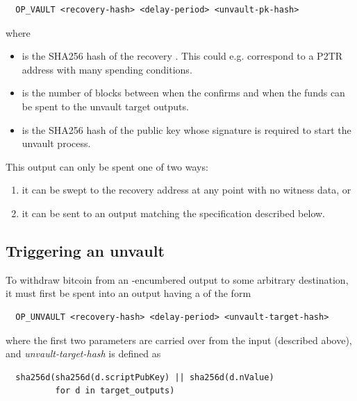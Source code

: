 \documentclass[10pt]{article}
\begin{document}
\begin{verbatim}
  OP_VAULT <recovery-hash> <delay-period> <unvault-pk-hash> 
\end{verbatim}
\noindent where

\begin{itemize}
  \item {} is the SHA256 hash of the recovery \spk{}. This could
    e.g. correspond to a P2TR address with many spending conditions.

  \item {} is the number of blocks between when the \opuv{} confirms
    and when the funds can be spent to the unvault target outputs.

  \item {} is the SHA256 hash of the public key whose signature is
    required to start the unvault process.

\end{itemize}

This output can only be spent one of two ways: 

\begin{enumerate}
  \item it can be swept to the recovery address at any point with no witness data, or
  \item it can be sent to an \opuv{} output matching the specification described
    below.
\end{enumerate}

\subsection*{Triggering an unvault}

To withdraw bitcoin from an \opv{}-encumbered output to some arbitrary destination, it
must first be spent into an \opuv{} output having a  of the form

\begin{verbatim}
  OP_UNVAULT <recovery-hash> <delay-period> <unvault-target-hash> 
\end{verbatim}

\noindent where the first two parameters are carried over from the input \opv{}
(described above), and
\emph{unvault-target-hash} is defined as

\begin{verbatim}
  sha256d(sha256d(d.scriptPubKey) || sha256d(d.nValue) 
          for d in target_outputs)
\end{verbatim}
\end{document}
